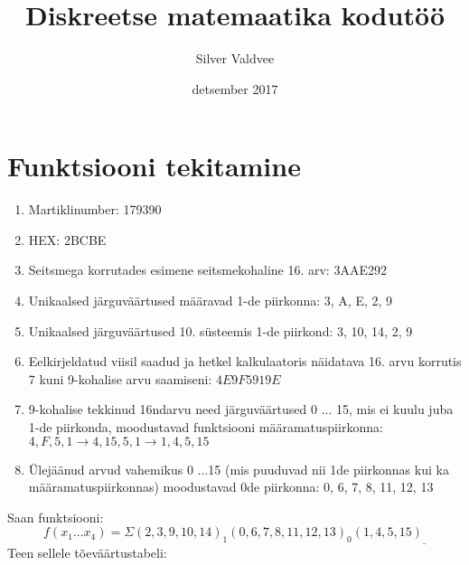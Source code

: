 \documentclass{article}
\title{Diskreetse matemaatika kodutöö}
\author{Silver Valdvee}
\date{detsember 2017}
\begin{document}
\maketitle

\section{Funktsiooni tekitamine}
\begin{enumerate}
    \item Martiklinumber: 179390
    \item HEX: 2BCBE
    \item Seitsmega korrutades esimene seitsmekohaline 16. arv: 3AAE292
    \item Unikaalsed järguväärtused määravad 1-de piirkonna: 3, A, E, 2, 9
    \item Unikaalsed järguväärtused 10. süsteemis 1-de piirkond: 3, 10, 14, 2, 9
    \item Eelkirjeldatud viisil saadud ja hetkel kalkulaatoris näidatava 16. arvu korrutis 7 kuni 9-kohalise arvu saamiseni: $4E9F5919E$
    \item 9-kohalise tekkinud 16ndarvu need järguväärtused 0 ... 15, mis ei kuulu juba 1-de piirkonda, moodustavad funktsiooni määramatuspiirkonna: $4, F, 5, 1 \rightarrow 4, 15, 5, 1 \rightarrow 1, 4, 5, 15$
    \item Ülejäänud arvud vahemikus 0 ...15 (mis puuduvad nii 1de piirkonnas kui ka määramatuspiirkonnas) moodustavad 0de piirkonna: 0, 6, 7, 8, 11, 12, 13
\end{enumerate}
Saan funktsiooni:
\[f(x_1...x_4)=\Sigma(2,3,9,10,14)_1(0,6,7,8,11,12,13)_0(1,4,5,15)_{\_}
\]
Teen sellele tõeväärtustabeli:
\end{document}
